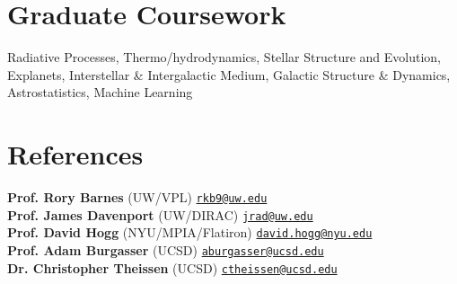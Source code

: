 \documentclass[margin,line]{resume}
\newcommand{\tab}[1]{\hspace{.2667\textwidth}\rlap{#1}}
\newcommand{\itab}[1]{\hspace{0em}\rlap{#1}}
\begin{document}
\begin{resume}

\section{\mysidestyle \textcolor{bcolor}{Graduate Coursework}} 

Radiative Processes, Thermo/hydrodynamics, Stellar Structure and Evolution, Explanets, Interstellar \& Intergalactic Medium, Galactic Structure \& Dynamics, Astrostatistics, Machine Learning



\section{\mysidestyle \textcolor{bcolor}{References}}
\textbf{Prof. Rory Barnes} (UW/VPL) \hfill {\tt \href{rkb9@uw.edu}{rkb9@uw.edu}} \\
\textbf{Prof. James Davenport} (UW/DIRAC) \hfill {\tt \href{jrad@uw.edu}{jrad@uw.edu}} \\
\textbf{Prof. David Hogg} (NYU/MPIA/Flatiron) \hfill {\tt \href{david.hogg@nyu.edu}{david.hogg@nyu.edu}}  \\
\textbf{Prof. Adam Burgasser} (UCSD) \hfill {\tt \href{aburgasser@ucsd.edu}{aburgasser@ucsd.edu}}   \\
\textbf{Dr. Christopher Theissen} (UCSD) \hfill {\tt \href{ctheissen@ucsd.edu}{ctheissen@ucsd.edu}}  
 	       
\end{resume}   
\end{document}
